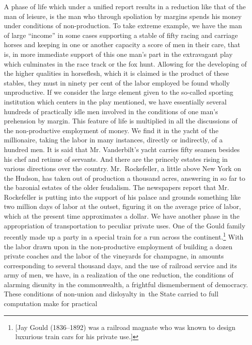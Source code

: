 \documentclass[openany,nobib]{tufte-book}
\begin{document}
A phase of life which under a unified report results in a reduction like
that of the man of leisure, is the man who through spoliation by margins
spends his money under conditions of non-production. To take extreme
example, we have the man of large ``income'' in some cases supporting a
stable of fifty racing and carriage horses and keeping in one or another
capacity a score of men in their care, that is, in more immediate
support of this one man's part in the extravagant play which culminates
in the race track or the fox hunt. Allowing for the developing of the
higher qualities in horseflesh, which it is claimed is the product of
these stables, they must in ninety per cent of the labor employed be
found wholly unproductive. If we consider the large element given to the
so-called sporting institution which centers in the play mentioned, we
have essentially several hundreds of practically idle men involved in
the conditions of one man's prehension by margin. This feature of life
is multiplied in all the discussions of the non-productive employment of
money. We find it in the yacht of the millionaire, taking the labor in
many instances, directly or indirectly, of a hundred men. It is said
that Mr. Vanderbilt's yacht carries fifty seamen besides his chef and
retinue of servants. And there are the princely estates rising in
various directions over the country. Mr.~Rockefeller, a little above New
York on the Hudson, has taken out of production a thousand acres,
answering in so far to the baronial estates of the older feudalism. The
newspapers report that Mr. Rockefeller is putting into the support of
his palace and grounds something like two million days of labor at the
outset, figuring it on the average price of labor, which at the present
time approximates a dollar. We have another phase in the appropriation
of transportation to peculiar private uses. One of the Gould family
recently made up a party in a special train for a run across the
continent.\footnote{{[}Jay Gould (1836--1892) was a railroad magnate who
  was known to design luxurious train cars for his private use.{]}} With
the labor drawn upon in the non-productive employment of building a
dozen private coaches and the labor of the vineyards for champagne, in
amounts corresponding to several thousand days, and the use of railroad
service and its army of men, we have, in a realization of the one
reduction, the conditions of alarming disunity in the commonwealth, a
frightful dismemberment of democracy. These conditions of non-union and
disloyalty in~the State carried to full computation make for practical
\end{document}
